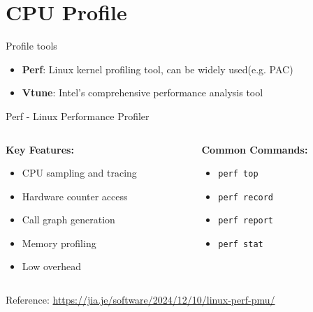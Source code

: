 \section{CPU Profile}

\begin{frame}{Profile tools}
    \begin{itemize}
        \item \textbf{Perf}: Linux kernel profiling tool, can be widely used(e.g. PAC)
        \item \textbf{Vtune}: Intel's comprehensive performance analysis tool
    \end{itemize}
\end{frame}

\begin{frame}{Perf - Linux Performance Profiler}
    \begin{columns}
        \begin{column}{0.6\textwidth}
            \textbf{Key Features:}
            \begin{itemize}
                \item CPU sampling and tracing
                \item Hardware counter access
                \item Call graph generation
                \item Memory profiling
                \item Low overhead
            \end{itemize}
        \end{column}
        \begin{column}{0.4\textwidth}
            \textbf{Common Commands:}
            \begin{itemize}
                \item \texttt{perf top}
                \item \texttt{perf record}
                \item \texttt{perf report}
                \item \texttt{perf stat}
            \end{itemize}
        \end{column}
    \end{columns}
    
    \vspace{0.3cm}
    \footnotesize{Reference: \url{https://jia.je/software/2024/12/10/linux-perf-pmu/}}
\end{frame}

